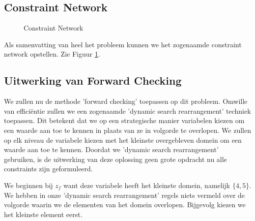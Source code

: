 \documentclass[alternative-exam.tex]{subfiles}
\begin{document}
\subsection{Constraint Network}
\begin{figure}[H]
\caption{Constraint Network}
\label{constraint_network}
\centering
{}
\end{figure}
Als samenvatting van heel het probleem kunnen we het zogenaamde constraint network opstellen. Zie Figuur \ref{constraint_network}.

\subsection{Uitwerking van Forward Checking}
We zullen nu de methode 'forward checking' toepassen op dit probleem. Omwille van effici\"entie zullen we een zogenaamde 'dynamic search rearrangement' techniek toepassen. Dit betekent dat we op een strategische manier variabelen kiezen om een waarde aan toe te kennen in plaats van ze in volgorde te overlopen. We zullen op elk niveau de variabele kiezen met het kleinste overgebleven domein om een waarde aan toe te kennen.
Doordat we 'dynamic search rearrangement' gebruiken, is de uitwerking van deze oplossing geen grote opdracht nu alle constraints zijn geformuleerd.

We beginnen bij $z_f$ want deze variabele heeft het kleinste domein, namelijk $\{4,5\}$. We hebben in onze 'dynamic search rearrangement' regels niets vermeld over de volgorde waarin we de elementen van het domein overlopen. Bijgevolg kiezen we het kleinste element eerst.
\end{document}
